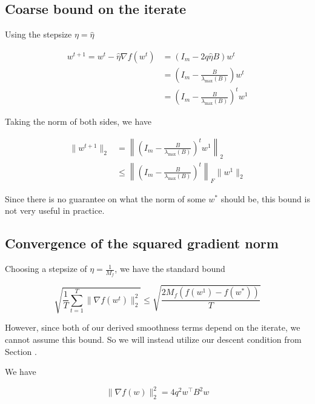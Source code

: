 \documentclass[11pt]{article}
\begin{document}
\subsection{Coarse bound on the iterate}

Using the stepsize $\eta = \hat{\eta}$

\begin{align*}
    w^{t+1} = w^t - \hat{\eta} \nabla f(w^t)
    &= (I_m - 2q \hat{\eta} B)w^t \\
    &= \left( I_m - \frac{B}{\lambda_{\max}(B)} \right) w^t \\
    &= \left( I_m - \frac{B}{\lambda_{\max}(B)} \right)^t w^1
\end{align*}

Taking the norm of both sides, we have

\begin{align*}
    \|w^{t+1}\|_2 &= \left\|\left( I_m - \frac{B}{\lambda_{\max}(B)} \right)^t w^1 \right\|_2 \\
    &\leq \left\|\left( I_m - \frac{B}{\lambda_{\max}(B)} \right)^t \right\|_F \|w^1\|_2
\end{align*}

Since there is no guarantee on what the norm of some $w^*$ should be, this bound is not very useful in practice.

\subsection{Convergence of the squared gradient norm}


Choosing a stepsize of $\eta = \frac{1}{M_f}$, we have the standard bound

\begin{equation}
    \sqrt{\frac{1}{T} \sum_{t=1}^{T} \| \nabla f(w^t) \|_2^2} \leq \sqrt{\frac{2 M_f (f(w^1) - f(w^*))}{T}}
\end{equation}

However, since both of our derived smoothness terms depend on the iterate, we cannot assume this bound. So we will instead utilize our descent condition from Section \label{sec:grad_descent}.

We have

\begin{equation}
    \| \nabla f(w) \|_2^2 = 4 q^2 w^{\top} B^2 w
\end{equation}
\end{document}
